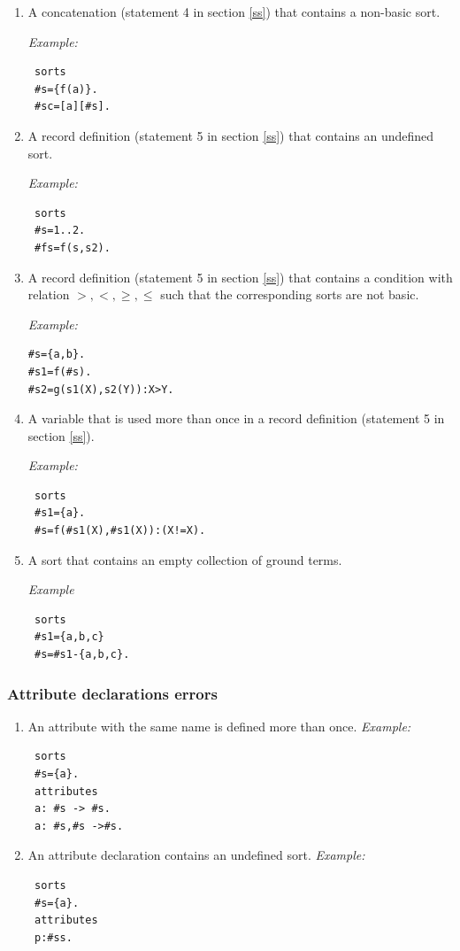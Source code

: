 \documentclass[12pt, letterpaper]{article}
\begin{document}
\begin{enumerate}
\item A concatenation (statement  4 in section \ref{ss}) that contains a non-basic sort.

\textit{Example:}
\begin{verbatim}
 sorts
 #s={f(a)}.
 #sc=[a][#s].
\end{verbatim}



\item A record definition (statement 5 in section \ref{ss}) that contains an undefined sort.

\textit{Example:}
\begin{verbatim}
 sorts
 #s=1..2.
 #fs=f(s,s2).
\end{verbatim}



\item A record definition  (statement 5 in section \ref{ss}) that contains a condition with relation $>,<,\geq,\leq$ such that the
   corresponding sorts are not basic.

\textit{Example:}
\begin{verbatim}
#s={a,b}.
#s1=f(#s). 
#s2=g(s1(X),s2(Y)):X>Y.
\end{verbatim}

\item  A variable that is used more than once in a record definition (statement  5 in section \ref{ss}).

\textit{Example:}

\begin{verbatim}
 sorts
 #s1={a}.
 #s=f(#s1(X),#s1(X)):(X!=X).
\end{verbatim}
\item A sort that contains an empty collection of ground terms.

\textit{Example}
\begin{verbatim}
 sorts
 #s1={a,b,c}
 #s=#s1-{a,b,c}.
\end{verbatim}
\end{enumerate}
\subsubsection{Attribute declarations errors}

\begin{enumerate}
\item An attribute with the same name is defined more than once.
\textit{Example:}
\begin{verbatim}
 sorts
 #s={a}.
 attributes
 a: #s -> #s.
 a: #s,#s ->#s.
\end{verbatim}
\item An attribute declaration contains an undefined sort.
\textit{Example:}
\begin{verbatim}
 sorts
 #s={a}.
 attributes
 p:#ss.
\end{verbatim}
\end{enumerate}
\end{document}
